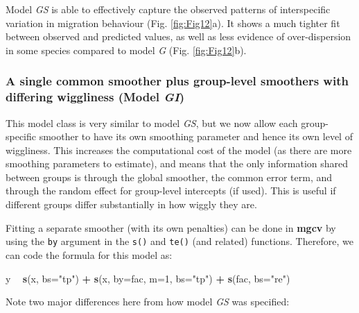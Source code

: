\documentclass[12pt]{article}
\newenvironment{Shaded}{\begin{snugshade}}{\end{snugshade}}
\newcommand{\KeywordTok}[1]{\textcolor[rgb]{0.13,0.29,0.53}{\textbf{#1}}}
\newcommand{\DataTypeTok}[1]{\textcolor[rgb]{0.13,0.29,0.53}{#1}}
\newcommand{\DecValTok}[1]{\textcolor[rgb]{0.00,0.00,0.81}{#1}}
\newcommand{\StringTok}[1]{\textcolor[rgb]{0.31,0.60,0.02}{#1}}
\newcommand{\OperatorTok}[1]{\textcolor[rgb]{0.81,0.36,0.00}{\textbf{#1}}}
\newcommand{\NormalTok}[1]{#1}
\begin{document}
Model \emph{GS} is able to effectively capture the observed patterns of
interspecific variation in migration behaviour (Fig. \ref{fig:Fig12}a).
It shows a much tighter fit between observed and predicted values, as
well as less evidence of over-dispersion in some species compared to
model \emph{G} (Fig. \ref{fig:Fig12}b).

\subsubsection{\texorpdfstring{A single common smoother plus group-level
smoothers with differing wiggliness (Model
\emph{GI})}{A single common smoother plus group-level smoothers with differing wiggliness (Model GI)}}\label{a-single-common-smoother-plus-group-level-smoothers-with-differing-wiggliness-model-gi}

This model class is very similar to model \emph{GS}, but we now allow
each group-specific smoother to have its own smoothing parameter and
hence its own level of wiggliness. This increases the computational cost
of the model (as there are more smoothing parameters to estimate), and
means that the only information shared between groups is through the
global smoother, the common error term, and through the random effect
for group-level intercepts (if used). This is useful if different groups
differ substantially in how wiggly they are.

Fitting a separate smoother (with its own penalties) can be done in
\textbf{mgcv} by using the \texttt{by} argument in the \texttt{s()} and
\texttt{te()} (and related) functions. Therefore, we can code the
formula for this model as:

\begin{Shaded}
\begin{Highlighting}[]
\NormalTok{y }\OperatorTok{~}\StringTok{ }\KeywordTok{s}\NormalTok{(x, }\DataTypeTok{bs=}\StringTok{"tp"}\NormalTok{) }\OperatorTok{+}\StringTok{ }\KeywordTok{s}\NormalTok{(x, }\DataTypeTok{by=}\NormalTok{fac, }\DataTypeTok{m=}\DecValTok{1}\NormalTok{, }\DataTypeTok{bs=}\StringTok{"tp"}\NormalTok{) }\OperatorTok{+}\StringTok{ }\KeywordTok{s}\NormalTok{(fac, }\DataTypeTok{bs=}\StringTok{"re"}\NormalTok{)}
\end{Highlighting}
\end{Shaded}

Note two major differences here from how model \emph{GS} was specified:
\end{document}
